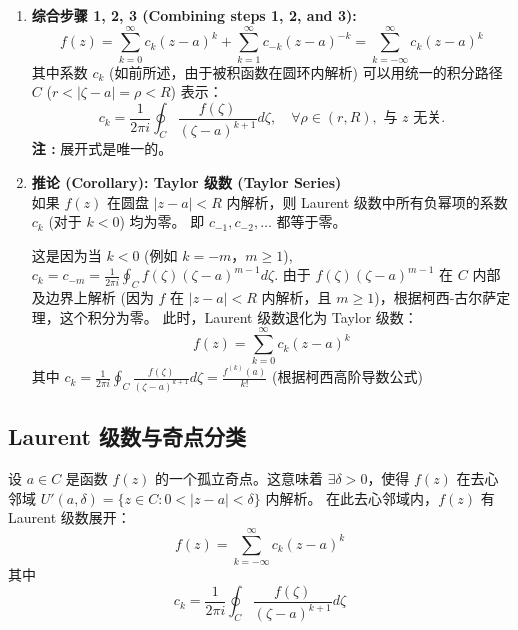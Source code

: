 \documentclass[linespread=1.5,openany]{book}%
\def\C{C}%
\def\diff{d}%
\theoremstyle{plain}
\newcommand{\diff}{\mathop{}\!\mathrm{d}}  %
\newcommand{\C}{\mathbb{C}}                %
\begin{document}
{{{{{{{{\begin{enumerate}[label=\arabic*)]
											\item \textbf{综合步骤 1, 2, 3 (Combining steps 1, 2, and 3):}
											\begin{equation}
												f(z) = \sum_{k=0}^{\infty} c_k (z-a)^k + \sum_{k=1}^{\infty} c_{-k} (z-a)^{-k}  = \sum_{k=-\infty}^{\infty} c_k (z-a)^k
											\end{equation}
											其中系数 $c_k$ (如前所述，由于被积函数在圆环内解析) 可以用统一的积分路径 $C$ ($r < |\zeta-a|=\rho < R$) 表示：
											\begin{equation}
												c_k = \frac{1}{2\pi i} \oint_C \frac{f(\zeta)}{(\zeta-a)^{k+1}} \diff \zeta, \quad \forall \rho \in (r,R), \text{ 与 } z \text{ 无关}. 	\end{equation}
											\textbf{注 :} 展开式是唯一的。
											
											
											\item \textbf{推论 (Corollary): Taylor 级数 (Taylor Series)} \\
											如果 $f(z)$ 在圆盘 $|z-a|<R$ 内解析，则 Laurent 级数中所有负幂项的系数 $c_k$ (对于 $k<0$) 均为零。
											即 $c_{-1}, c_{-2}, \dots$ 都等于零。
											
											这是因为当 $k < 0$ (例如 $k = -m$，$m \ge 1$), $c_k = c_{-m} = \frac{1}{2\pi i} \oint_C f(\zeta)(\zeta-a)^{m-1} \diff \zeta$.
											由于 $f(\zeta)(\zeta-a)^{m-1}$ 在 $C$ 内部及边界上解析 (因为 $f$ 在 $|z-a|<R$ 内解析，且 $m \ge 1$)，根据柯西-古尔萨定理，这个积分为零。
											此时，Laurent 级数退化为 Taylor 级数：
											\[ f(z) = \sum_{k=0}^{\infty} c_k (z-a)^k \]
											其中 $c_k = \frac{1}{2\pi i} \oint_C \frac{f(\zeta)}{(\zeta-a)^{k+1}} \diff \zeta = \frac{f^{(k)}(a)}{k!}$ (根据柯西高阶导数公式)
											
											
											
											
										\end{enumerate}
									} 
									
									\subsection{Laurent 级数与奇点分类 }
									{ %
										设 $a \in \C$ 是函数 $f(z)$ 的一个孤立奇点。这意味着 $\exists \delta > 0$，使得 $f(z)$ 在去心邻域 $U'(a, \delta) = \{z \in \C : 0 < |z-a| < \delta\}$ 内解析。
										在此去心邻域内，$f(z)$ 有 Laurent 级数展开：
										\[ f(z) = \sum_{k=-\infty}^{\infty} c_k (z-a)^k \]
										其中 
										\[c_k = \frac{1}{2\pi i} \oint_{C} \frac{f(\zeta)}{(\zeta-a)^{k+1}} \diff \zeta\]
										
}}}}}}}}
\end{document}
